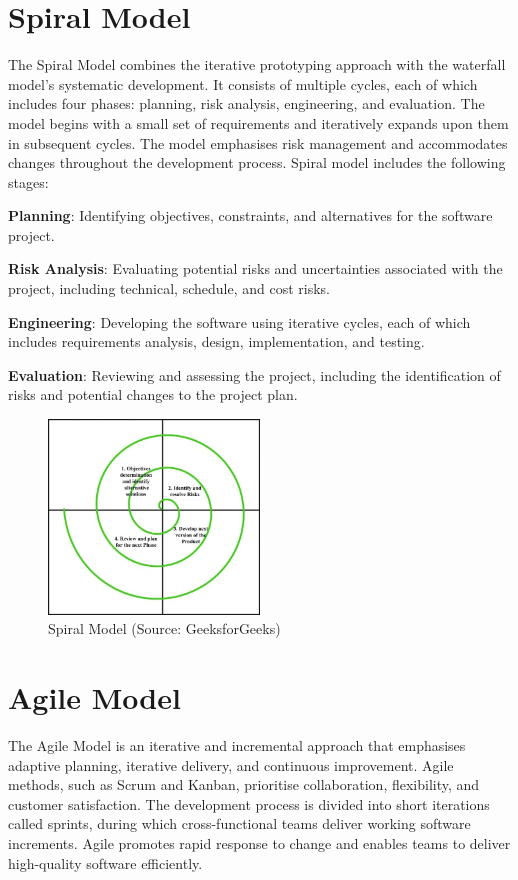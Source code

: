 \documentclass[12pt, a4paper]{article}
\begin{document}
\section{Spiral Model}
The Spiral Model combines the iterative prototyping approach with the waterfall model's systematic development. It consists of multiple cycles, each of which includes four phases: planning, risk analysis, engineering, and evaluation. The model begins with a small set of requirements and iteratively expands upon them in subsequent cycles. The model emphasises risk management and accommodates changes throughout the development process.
Spiral model includes the following stages:

\textbf{Planning}: Identifying objectives, constraints, and alternatives for the software project.

\textbf{Risk Analysis}: Evaluating potential risks and uncertainties associated with the project, including technical, schedule, and cost risks.

\textbf{Engineering}: Developing the software using iterative cycles, each of which includes requirements analysis, design, implementation, and testing.

\textbf{Evaluation}: Reviewing and assessing the project, including the identification of risks and potential changes to the project plan.

\begin{figure}[h]
    \centering
    \includegraphics[width=0.5\textwidth]{images/spiral-model.jpg}
    \caption{Spiral Model (Source: GeeksforGeeks)}
    \label{fig:Spiral}
\end{figure}

\section{Agile Model}
The Agile Model is an iterative and incremental approach that emphasises adaptive planning, iterative delivery, and continuous improvement. Agile methods, such as Scrum and Kanban, prioritise collaboration, flexibility, and customer satisfaction. The development process is divided into short iterations called sprints, during which cross-functional teams deliver working software increments. Agile promotes rapid response to change and enables teams to deliver high-quality software efficiently.
\end{document}
